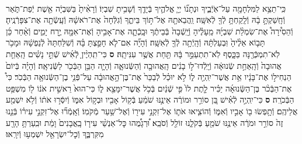 \documentclass[twoside, openany, parskip=half, 11pt]{book}
\begin{document}
\begin{footnotesize}
\begin{multicols}{2}
\\
כִּֽי־תֵצֵ֥א לַמִּלְחָמָ֖ה עַל־אֹֽיְֿבֶ֑יךָ וּנְתָנ֞וֹ יְיָ֧ אֱלֹהֶ֛יךָ בְּֿיָדֶ֖ךָ וְֿשָׁבִ֥יתָ שִׁבְיֽוֹ׃ וְֿרָאִ֨יתָ֙ בַּשִּׁבְיָ֔ה אֵ֖שֶׁת יְֿפַת־תֹּ֑אַר וְֿחָֽשַׁקְתָּ֣ בָ֔הּ וְֿלָֽקַחְתָּ֥ לְֿךָ֖ לְֿאִשָּֽׁה׃ וַֽהֲבֵאתָ֖הּ אֶל־תּ֣וֹךְ בֵּיתֶ֑ךָ וְֿגִלְּֿחָה֙ אֶת־רֹאשָׁ֔הּ וְֿעָֽשְֿׂתָ֖ה אֶת־צִפָּרְֿנֶֽיהָ׃ וְֿהֵסִ֩ירָה֩ אֶת־שִׂמְלַ֨ת שִׁבְיָ֜הּ מֵֽעָלֶ֗יהָ וְֿיָֽשְֿׁבָה֙ בְּֿבֵיתֶ֔ךָ וּבָֽכְֿתָ֛ה אֶת־אָבִ֥יהָ וְֿאֶת־אִמָּ֖הּ יֶ֣רַח יָמִ֑ים וְֿאַ֨חַר כֵּ֜ן תָּב֤וֹא אֵלֶ֨יהָ֙ וּֽבְעַלְתָּ֔הּ וְֿהָֽיְֿתָ֥ה לְֿךָ֖ לְֿאִשָּֽׁה׃ וְֿהָיָ֞ה אִם־לֹ֧א חָפַ֣צְתָּ בָּ֗הּ וְֿשִׁלַּחְתָּהּ֙ לְֿנַפְשָׁ֔הּ וּמָכֹ֥ר לֹֽא־תִמְכְּֿרֶ֖נָּה בַּכָּ֑סֶף לֹֽא־תִתְעַמֵּ֣ר בָּ֔הּ תַּ֖חַת אֲשֶׁ֥ר עִנִּיתָֽהּ׃ \textbf{ס}
כִּי־תִֽהְיֶ֨יןָ לְֿאִ֜ישׁ שְֿׁתֵּ֣י נָשִׁ֗ים הָֽאַחַ֤ת אֲהוּבָה֙ וְֿהָֽאַחַ֣ת שְֿׂנוּאָ֔ה וְֿיָֽלְֿדוּ־ל֣וֹ בָנִ֔ים הָֽאֲהוּבָ֖ה וְֿהַשְּֿׂנוּאָ֑ה וְֿהָיָ֛ה הַבֵּ֥ן הַבְּֿכֹ֖ר לַשְּֿׂנִיאָֽה׃ וְֿהָיָ֗ה בְּֿיוֹם֙ הַנְחִיל֣וֹ אֶת־בָּנָ֔יו אֵ֥ת אֲשֶׁר־יִֽהְיֶ֖ה ל֑וֹ לֹ֣א יוּכַ֗ל לְֿבַכֵּר֙ אֶת־בֶּן־הָ֣אֲהוּבָ֔ה עַל־פְּֿנֵ֥י בֶן־הַשְּֿׂנוּאָ֖ה הַבְּֿכֹֽר׃ כִּי֩ אֶת־הַבְּֿכֹ֨ר בֶּן־הַשְּֿׂנוּאָ֜ה יַכִּ֗יר לָ֤תֶת לוֹ֙ פִּ֣י שְֿׁנַ֔יִם בְּֿכֹ֥ל אֲשֶׁר־יִמָּצֵ֖א ל֑וֹ כִּי־הוּא֙ רֵאשִׁ֣ית אֹנ֔וֹ ל֖וֹ מִשְׁפַּ֥ט הַבְּֿכֹרָֽה׃ \textbf{ס}
כִּי־יִֽהְיֶ֣ה לְֿאִ֗ישׁ בֵּ֚ן סוֹרֵ֣ר וּמוֹרֶ֔ה אֵינֶ֣נּוּ שֹׁמֵ֔עַ בְּֿק֥וֹל אָבִ֖יו וּבְק֣וֹל אִמּ֑וֹ וְֿיִסְּֿר֣וּ אֹת֔וֹ וְֿלֹ֥א יִשְׁמַ֖ע אֲלֵיהֶֽם׃ וְֿתָ֥פְשׂוּ ב֖וֹ אָבִ֣יו וְֿאִמּ֑וֹ וְֿהוֹצִ֧יאוּ אֹת֛וֹ אֶל־זִקְנֵ֥י עִיר֖וֹ וְֿאֶל־שַׁ֥עַר מְֿקֹמֽוֹ׃ וְֿאָֽמְֿר֞וּ אֶל־זִקְנֵ֣י עִיר֗וֹ בְּֿנֵ֤נוּ זֶה֙ סוֹרֵ֣ר וּמֹרֶ֔ה אֵינֶ֥נּוּ שֹׁמֵ֖עַ בְּֿקֹלֵ֑נוּ זוֹלֵ֖ל וְֿסֹבֵֽא׃ וּ֠רְגָמֻ֠הוּ כׇּל־אַנְשֵׁ֨י עִיר֤וֹ בָֽאֲבָנִים֙ וָמֵ֔ת וּבִֽעַרְתָּ֥ הָרָ֖ע מִקִּרְבֶּ֑ךָ וְֿכׇל־יִשְׂרָאֵ֖ל יִשְׁמְע֥וּ וְֿיִרָֽאוּ׃


\end{multicols}
\end{footnotesize}
\end{document}

